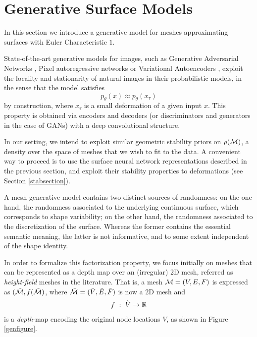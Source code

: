 \section{Generative Surface Models}
\label{genmodelsec}

In this section we introduce a generative model for meshes  
approximating surfaces with Euler Characteristic $1$. 

State-of-the-art generative models for images, 
such as Generative Adversarial Networks \cite{dcgan}, Pixel autoregressive 
networks \cite{pixelrnn} or Variational Autoencoders \cite{vae}, exploit the locality 
and stationarity of natural images in their probabilistic models,
in the sense that the model satisfies 
\begin{equation}
\label{gen_stab}
p_\theta(x) \approx p_\theta( x_\tau)
\end{equation}
by construction, where $x_\tau$ is a small deformation of a given input $x$. 
This property is obtained via encoders and decoders (or discriminators and generators in the case of GANs) 
with a deep convolutional structure.  

In our setting, we intend to exploit similar geometric stability priors 
on $p({\mathcal{M}})$, a density over the space of meshes that we wish to fit to the data. 
A convenient way to proceed is to use the surface neural network representations 
described in the previous section, and exploit their stability properties to deformations (see Section \ref{stabsection}). 

A mesh generative model contains two distinct sources of randomness: 
on the one hand, the randomness associated to the underlying continuous surface, 
which corresponds to shape variability; on the other hand, 
the randomness associated to the discretization of the surface. Whereas 
the former contains the essential semantic meaning, the latter is not 
informative, and to some extent independent of the shape identity. 

In order to formalize this factorization property, we focus initially 
on meshes that can be represented as a depth map over an (irregular) 
2D mesh, referred as \emph{height-field} meshes in the literature.
That is, a mesh ${\mathcal{M}}=(V, E, F)$ is expressed as 
$(\tilde{{\mathcal{M}}}, f(\tilde{{\mathcal{M}}})$, where $\tilde{{\mathcal{M}}}=(\tilde{V}, \tilde{E}, \tilde{F})$ is now a 2D mesh 
and 
$$f~:~\tilde{V} \to {\mathbb{R}}$$ 
is a \emph{depth}-map encoding the original node locations $V$, as shown in Figure \ref{genfigure}.

